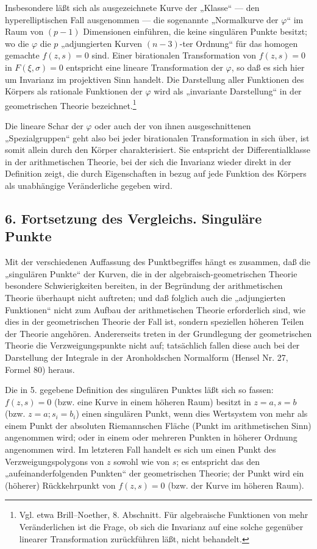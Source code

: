 \documentclass[11pt]{article}
\begin{document}
Insbesondere läßt sich als ausgezeichnete Kurve der „Klasse“ --- den hyperelliptischen Fall ausgenommen --- die sogenannte „Normalkurve der \(\varphi\)“ im Raum von \((p-1)\) Dimensionen einführen, die keine singulären Punkte besitzt; wo die \(\varphi\) die \(p\) „adjungierten Kurven \((n-3)\)-ter Ordnung“ für das homogen gemachte \(f(z,s)=0\) sind. Einer birationalen Transformation von \(f(z,s)=0\) in \(F(\xi,\sigma)=0\) entspricht eine lineare Transformation der \(\varphi\), so daß es sich hier um Invarianz im projektiven Sinn handelt. Die Darstellung aller Funktionen des Körpers als rationale Funktionen der \(\varphi\) wird als „invariante Darstellung“ in der geometrischen Theorie bezeichnet.\footnote{Vgl. etwa Brill--Noether, 8. Abschnitt. Für algebraische Funktionen von mehr Veränderlichen ist die Frage, ob sich die Invarianz auf eine solche gegenüber linearer Transformation zurückführen läßt, nicht behandelt.}

Die lineare Schar der \(\varphi\) oder auch der von ihnen ausgeschnittenen „Spezialgruppen“ geht also bei jeder birationalen Transformation in sich über, ist somit allein durch den Körper charakterisiert. Sie entspricht der Differentialklasse in der arithmetischen Theorie, bei der sich die Invarianz wieder direkt in der Definition zeigt, die durch Eigenschaften in bezug auf jede Funktion des Körpers als unabhängige Veränderliche gegeben wird.

\subsection*{6. Fortsetzung des Vergleichs. Singuläre Punkte}
Mit der verschiedenen Auffassung des Punktbegriffes hängt es zusammen, daß die „singulären Punkte“ der Kurven, die in der algebraisch-geometrischen Theorie besondere Schwierigkeiten bereiten, in der Begründung der arithmetischen Theorie überhaupt nicht auftreten; und daß folglich auch die „adjungierten Funktionen“ nicht zum Aufbau der arithmetischen Theorie erforderlich sind, wie dies in der geometrischen Theorie der Fall ist, sondern speziellen höheren Teilen der Theorie angehören. Andererseits treten in der Grundlegung der geometrischen Theorie die Verzweigungspunkte nicht auf; tatsächlich fallen diese auch bei der Darstellung der Integrale in der Aronholdschen Normalform (Hensel Nr. 27, Formel 80) heraus.

Die in 5. gegebene Definition des singulären Punktes läßt sich so fassen: \(f(z,s)=0\) (bzw. eine Kurve in einem höheren Raum) besitzt in \(z=a,s=b\) (bzw. \(z=a; s_i=b_i\)) einen singulären Punkt, wenn dies Wertsystem von mehr als einem Punkt der absoluten Riemannschen Fläche (Punkt im arithmetischen Sinn) angenommen wird; oder in einem oder mehreren Punkten in höherer Ordnung angenommen wird. Im letzteren Fall handelt es sich um einen Punkt des Verzweigungspolygons von \(z\) sowohl wie von \(s\); es entspricht das den „aufeinanderfolgenden Punkten“ der geometrischen Theorie; der Punkt wird ein (höherer) Rückkehrpunkt von \(f(z,s)=0\) (bzw. der Kurve im höheren Raum).
\end{document}

